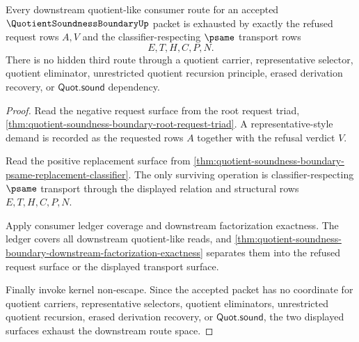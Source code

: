 \begin{theorem}
\label{thm:quotient-soundness-boundary-two-surface-exhaustion}
Every downstream quotient-like consumer route for an accepted $\QuotientSoundnessBoundaryUp$ packet is exhausted by exactly the refused request rows $A,V$ and the classifier-respecting $\psame$ transport rows
$$
E,T,H,C,P,N.
$$
There is no hidden third route through a quotient carrier, representative selector, quotient eliminator, unrestricted quotient recursion principle, erased derivation recovery, or $\mathsf{Quot.sound}$ dependency.
\end{theorem}
\begin{proof}
Read the negative request surface from the root request triad, \autoref{thm:quotient-soundness-boundary-root-request-triad}. A representative-style demand is recorded as the requested rows $A$ together with the refusal verdict $V$.

Read the positive replacement surface from \autoref{thm:quotient-soundness-boundary-psame-replacement-classifier}. The only surviving operation is classifier-respecting $\psame$ transport through the displayed relation and structural rows $E,T,H,C,P,N$.

Apply consumer ledger coverage and downstream factorization exactness. The ledger covers all downstream quotient-like reads, and \autoref{thm:quotient-soundness-boundary-downstream-factorization-exactness} separates them into the refused request surface or the displayed transport surface.

Finally invoke kernel non-escape. Since the accepted packet has no coordinate for quotient carriers, representative selectors, quotient eliminators, unrestricted quotient recursion, erased derivation recovery, or $\mathsf{Quot.sound}$, the two displayed surfaces exhaust the downstream route space.
\end{proof}

